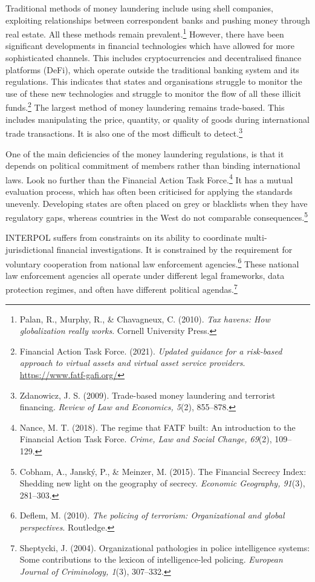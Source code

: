 Traditional methods of money laundering include using shell companies, exploiting relationships between correspondent banks and pushing money through real estate. All these methods remain prevalent.\footnote{Palan, R., Murphy, R., \& Chavagneux, C. (2010). \emph{Tax havens: How globalization really works}. Cornell University Press.} However, there have been significant developments in financial technologies which have allowed for more sophisticated channels. This includes cryptocurrencies and decentralised finance platforms (DeFi), which operate outside the traditional banking system and its regulations. This indicates that states and organisations struggle to monitor the use of these new technologies and struggle to monitor the flow of all these illicit funds.\footnote{Financial Action Task Force. (2021). \emph{Updated guidance for a risk-based approach to virtual assets and virtual asset service providers}. \url{https://www.fatf-gafi.org/}} The largest method of money laundering remains trade-based. This includes manipulating the price, quantity, or quality of goods during international trade transactions. It is also one of the most difficult to detect.\footnote{Zdanowicz, J. S. (2009). Trade-based money laundering and terrorist financing. \emph{Review of Law and Economics, 5}(2), 855–878.}

One of the main deficiencies of the money laundering regulations, is that it depends on political commitment of members rather than binding international laws. Look no further than the Financial Action Task Force.\footnote{Nance, M. T. (2018). The regime that FATF built: An introduction to the Financial Action Task Force. \emph{Crime, Law and Social Change, 69}(2), 109–129.} It has a mutual evaluation process, which has often been criticised for applying the standards unevenly. Developing states are often placed on grey or blacklists when they have regulatory gaps, whereas countries in the West do not comparable consequences.\footnote{Cobham, A., Janský, P., \& Meinzer, M. (2015). The Financial Secrecy Index: Shedding new light on the geography of secrecy. \emph{Economic Geography, 91}(3), 281–303.}

INTERPOL suffers from constraints on its ability to coordinate multi-jurisdictional financial investigations. It is constrained by the requirement for voluntary cooperation from national law enforcement agencies.\footnote{Deflem, M. (2010). \emph{The policing of terrorism: Organizational and global perspectives}. Routledge.} These national law enforcement agencies all operate under different legal frameworks, data protection regimes, and often have different political agendas.\footnote{Sheptycki, J. (2004). Organizational pathologies in police intelligence systems: Some contributions to the lexicon of intelligence-led policing. \emph{European Journal of Criminology, 1}(3), 307–332.}

